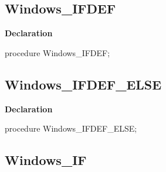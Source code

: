 \documentclass{report}
\newif\ifpdf
\begin{document}
\subsection*{Windows{\_}IFDEF}
\fi
\label{ok_if_expressions-Windows_IFDEF}
\begin{list}{}{
\setlength{\itemindent}{0cm}
\setlength{\listparindent}{0cm}
\setlength{\leftmargin}{\evensidemargin}
\addtolength{\leftmargin}{\tmplength}
\settowidth{\labelsep}{X}
\addtolength{\leftmargin}{\labelsep}
\setlength{\labelwidth}{\tmplength}
}
\item[\textbf{Declaration}\hfill]
\ifpdf
\begin{flushleft}
\fi
\begin{ttfamily}
procedure Windows{\_}IFDEF;\end{ttfamily}

\ifpdf
\end{flushleft}
\fi

\end{list}
\ifpdf
\subsection*{\large{\textbf{Windows{\_}IFDEF{\_}ELSE}}\normalsize\hspace{1ex}\hrulefill}
\else
\subsection*{Windows{\_}IFDEF{\_}ELSE}
\fi
\label{ok_if_expressions-Windows_IFDEF_ELSE}
\begin{list}{}{
\setlength{\itemindent}{0cm}
\setlength{\listparindent}{0cm}
\setlength{\leftmargin}{\evensidemargin}
\addtolength{\leftmargin}{\tmplength}
\settowidth{\labelsep}{X}
\addtolength{\leftmargin}{\labelsep}
\setlength{\labelwidth}{\tmplength}
}
\item[\textbf{Declaration}\hfill]
\ifpdf
\begin{flushleft}
\fi
\begin{ttfamily}
procedure Windows{\_}IFDEF{\_}ELSE;\end{ttfamily}

\ifpdf
\end{flushleft}
\fi

\end{list}
\ifpdf
\subsection*{\large{\textbf{Windows{\_}IF}}\normalsize\hspace{1ex}\hrulefill}
\else
\end{document}
